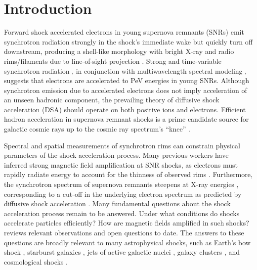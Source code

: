 \documentclass[iop, apj, numberedappendix]{emulateapj}
\begin{document}

\section{Introduction} \label{sec:intro}

Forward shock accelerated electrons in young supernova remnants (SNRs) emit
synchrotron radiation strongly in the shock's immediate wake but quickly turn
off downstream, producing a shell-like morphology with bright X-ray and radio
rims/filaments due to line-of-sight projection \citep{koyama1995}.  Strong and
time-variable synchrotron radiation \citep[e.g.,][]{uchiyama2007,
patnaude2007}, in conjunction with multiwavelength spectral modeling
\citep{aharonian2004, acero2010, ackermann2013}, suggests that electrons are
accelerated to PeV energies in young SNRs.  Although synchrotron emission due
to accelerated electrons does not imply acceleration of an unseen hadronic
component, the prevailing theory of diffusive shock acceleration (DSA) should
operate on both positive ions and electrons.  Efficient hadron acceleration in
supernova remnant shocks is a prime candidate source for galactic cosmic rays
up to the cosmic ray spectrum's ``knee'' \citep{vink2012}.

Spectral and spatial measurements of synchrotron rims can constrain physical
parameters of the shock acceleration process.  Many previous workers have
inferred strong magnetic field amplification at SNR shocks, as electrons must
rapidly radiate energy to account for the thinness of observed rims
\citep{bamba2003, vink2003, parizot2006}.  Furthermore, the synchrotron
spectrum of supernova remnants steepens at X-ray energies \citep{reynolds1999},
corresponding to a cut-off in the underlying electron spectrum as predicted by
diffusive shock acceleration \citep{webb1984}.  Many fundamental questions
about the shock acceleration process remain to be answered.  Under what
conditions do shocks accelerate particles efficiently?  How are magnetic fields
amplified in such shocks?  \citet{reynolds2008} reviews relevant observations
and open questions to date.  The answers to these questions are broadly
relevant to many astrophysical shocks, such as Earth's bow shock
\citep{ellison1990}, starburst galaxies \citep{heckman1990}, jets of active
galactic nuclei \citep{chen2014}, galaxy clusters \citep{van-weeren2010}, and
cosmological shocks \citep{ryu2008}.
\end{document}

